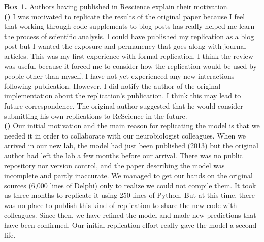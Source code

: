 \documentclass[a4paper,10pt, twocolumn]{article}
\begin{document}
\begin{tcolorbox}[breakable, pad at break*=1mm,
                  colback=black!2.5, arc=0pt, outer arc=0pt, boxrule=.25pt]
\begin{footnotesize}
\textbf{Box 1.} Authors having  published in Rescience explain their motivation.\\

\textbf{(\cite{stachelek:2016})} I was motivated to replicate the results of
the original paper because I feel that working through code supplements to blog
posts has really helped me learn the process of scientific analysis. I could 
have published my replication as a blog post but I wanted the exposure and 
permanency that goes along with journal articles. This was my first experience 
with formal replication. I think the review was useful because it forced me to 
consider how the replication would be used by people other than myself. I have 
not yet experienced any new interactions following publication. However, I did 
notify the author of the original implementation about the replication's 
publication. I think this may lead to future correspondence. The original author suggested that he would consider submitting his own replications to
ReScience in the future.\\

\textbf{(\cite{topalidou:2015b})} Our initial motivation and the main reason
for replicating the model is that we needed it in order to collaborate with our
neurobiologist colleagues. When we arrived in our new lab, the model had just
been published (2013) but the original author had left the lab a few months before
our arrival. There was no public repository nor version control, and the paper
describing the model was incomplete and partly inaccurate. We managed to get
our hands on the original sources (6,000 lines of Delphi) only to realize we
could not compile them. It took us three months to replicate it using 250 lines
of Python. But at this time, there was no place to publish this kind of
replication to share the new code with colleagues. Since then, we have refined
the model and made new predictions that have been confirmed. Our initial
replication effort really gave the model a second life.\\


\end{footnotesize}
\end{tcolorbox}
\end{document}
